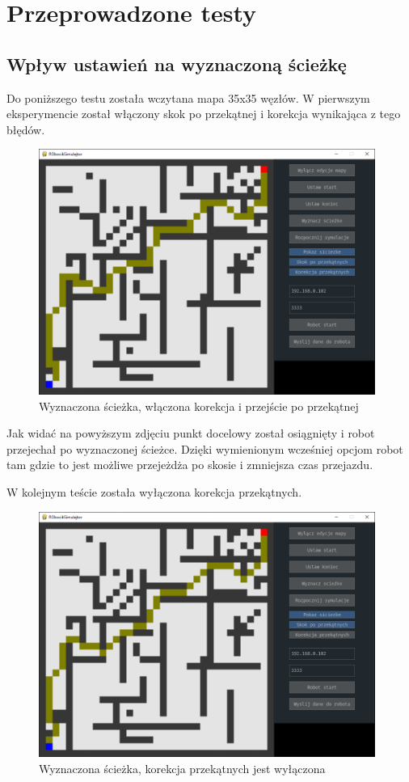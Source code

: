 \section{Przeprowadzone testy}

\subsection{Wpływ ustawień na wyznaczoną ścieżkę}

Do poniższego testu została wczytana mapa 35x35 węzłów. W pierwszym eksperymencie został włączony skok po
przekątnej i korekcja wynikająca z tego błędów.

\begin{figure}[H]
	\centering
	\includegraphics[width=11cm]{pages/testy/zdjecia/t2_1.png}
	\caption{Wyznaczona ścieżka, włączona korekcja i przejście po przekątnej}
\end{figure}

Jak widać na powyższym zdjęciu punkt docelowy został osiągnięty i robot przejechał po wyznaczonej ścieżce.
Dzięki wymienionym wcześniej opcjom robot tam gdzie to jest możliwe przejeżdża po skosie i zmniejsza czas przejazdu. 

W kolejnym teście została wyłączona korekcja przekątnych.
\begin{figure}[H]
	\centering
	\includegraphics[width=11cm]{pages/testy/zdjecia/t2_2.png}
	\caption{Wyznaczona ścieżka, korekcja przekątnych jest wyłączona}
\end{figure}

